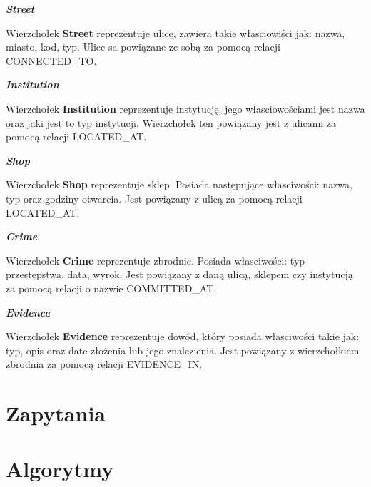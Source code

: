 \documentclass[a4paper,12pt]{article}
\begin{document}
\begin{center}
    \textbf{\textit{Street}}
\end{center}

Wierzchołek \textbf{Street} reprezentuje ulicę, zawiera takie własciowiści jak: nazwa, miasto, kod, typ. Ulice sa powiązane ze sobą za pomocą relacji CONNECTED\_TO.

\begin{center}
    \textbf{\textit{Institution}}
\end{center}

Wierzchołek \textbf{Institution} reprezentuje instytucję, jego własciowościami jest nazwa oraz jaki jest to typ instytucji. Wierzchołek ten powiązany jest z ulicami za pomocą relacji LOCATED\_AT.

\begin{center}
    \textbf{\textit{Shop}}
\end{center}

Wierzchołek \textbf{Shop} reprezentuje sklep. Posiada następujące własciwości: nazwa, typ oraz godziny otwarcia. Jest powiązany z ulicą za pomocą relacji LOCATED\_AT.

\begin{center}
    \textbf{\textit{Crime}}
\end{center}

Wierzchołek \textbf{Crime} reprezentuje zbrodnie. Posiada własciwości: typ przestępstwa, data, wyrok. Jest powiązany z daną ulicą, sklepem czy instytucją za pomocą relacji o nazwie COMMITTED\_AT.

\begin{center}
    \textbf{\textit{Evidence}}
\end{center}

Wierzchołek \textbf{Evidence} reprezentuje dowód, który posiada własciwości takie jak: typ, opis oraz date złożenia lub jego znalezienia. Jest powiązany z wierzchołkiem zbrodnia za pomocą relacji EVIDENCE\_IN.

\section{Zapytania}

\section{Algorytmy}
\end{document}

